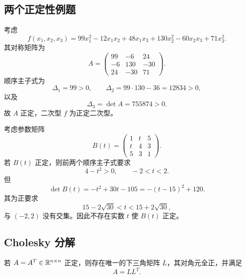 \subsection{两个正定性例题}

\begin{example}
考虑
\begin{equation}
 f(x_1,x_2,x_3)
 =99x_1^2-12x_1x_2+48x_1x_3
 +130x_2^2-60x_2x_3+71x_3^2.
\end{equation}
其对称矩阵为
\begin{equation}
 A=\begin{pmatrix}
 99&-6&24\\
 -6&130&-30\\
 24&-30&71
 \end{pmatrix}.
\end{equation}
顺序主子式为
\begin{equation}
 \Delta_1=99>0,
 \qquad
 \Delta_2=99\cdot130-36=12834>0,
\end{equation}
以及
\begin{equation}
 \Delta_3=\det A=755874>0.
\end{equation}
故 $A$ 正定，二次型 $f$ 为正定二次型。
\end{example}

\begin{example}
考虑参数矩阵
\begin{equation}
 B(t)=\begin{pmatrix}
 1&t&5\\
 t&4&3\\
 5&3&1
 \end{pmatrix}.
\end{equation}
若 $B(t)$ 正定，则前两个顺序主子式要求
\begin{equation}
 4-t^2>0,
 \qquad -2<t<2.
\end{equation}
但
\begin{equation}
 \det B(t)=-t^2+30t-105
 =-(t-15)^2+120.
\end{equation}
其为正要求
\begin{equation}
 15-2\sqrt{30}<t<15+2\sqrt{30},
\end{equation}
与 $(-2,2)$ 没有交集。因此不存在实数 $t$ 使 $B(t)$ 正定。
\end{example}

\subsection{Cholesky 分解}

\begin{theorem}[Cholesky]
若 $A=A^T\in\mathbb R^{n\times n}$ 正定，则存在唯一的下三角矩阵 $L$，其对角元全正，并满足
\begin{equation}
 A=LL^T.
\end{equation}
\end{theorem}

